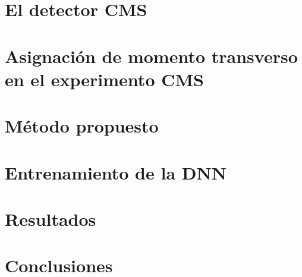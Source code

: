 \documentclass[a4paper,12pt]{article}
\begin{document}


\newpage

\section{El detector CMS}\label{sec:CMS}



\newpage

\section{Asignaci\'on de momento transverso en el experimento CMS}\label{sec:current_assignment}



\newpage

\section{M\'etodo propuesto}\label{sec:methodology}



\newpage

\section{Entrenamiento de la DNN}\label{sec:training}



\newpage

\section{Resultados}\label{sec:results}



\newpage

\section{Conclusiones}\label{sec:conclusions}



\newpage



\end{document}
